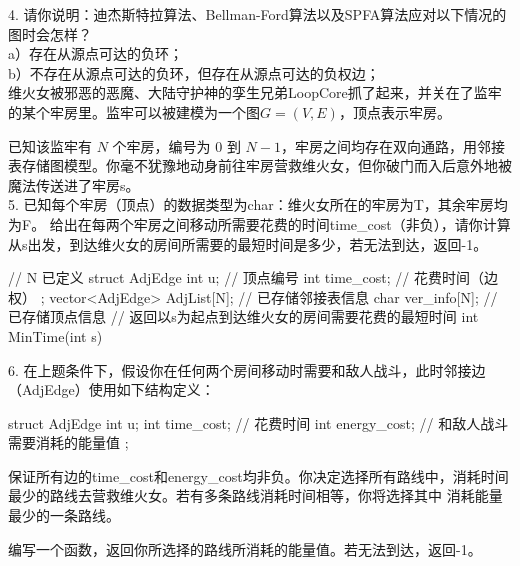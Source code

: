 \vspace{\baselineskip}

4. 请你说明：迪杰斯特拉算法、Bellman-Ford算法以及SPFA算法应对以下情况的图时会怎样？\\[0.5em]
a）存在从源点可达的负环；\\
b）不存在从源点可达的负环，但存在从源点可达的负权边；\\

维火女被邪恶的恶魔、大陆守护神的孪生兄弟LoopCore抓了起来，并关在了监牢的某个牢房里。监牢可以被建模为一个图$G=(V,E)$，顶点表示牢房。

已知该监牢有 $N$ 个牢房，编号为 0 到 $N-1$，牢房之间均存在双向通路，用邻接表存储图模型。你毫不犹豫地动身前往牢房营救维火女，但你破门而入后意外地被魔法传送进了牢房s。\\

5. 已知每个牢房（顶点）的数据类型为char：维火女所在的牢房为\textquotesingle T\textquotesingle，其余牢房均为\textquotesingle F\textquotesingle。
给出在每两个牢房之间移动所需要花费的时间time\_cost（非负），请你计算从s出发，到达维火女的房间所需要的最短时间是多少，若无法到达，返回-1。

\begin{cppcode}
    // N 已定义
    struct AdjEdge {
        int u;          // 顶点编号
        int time_cost;  // 花费时间（边权）
    };
    vector<AdjEdge> AdjList[N];    // 已存储邻接表信息
    char ver_info[N];   // 已存储顶点信息
    // 返回以s为起点到达维火女的房间需要花费的最短时间
    int MinTime(int s) {

    }
\end{cppcode}

\vspace{\baselineskip}

6. 在{\color{red}上题}条件下，假设你在任何两个房间移动时需要和敌人战斗，此时邻接边（AdjEdge）使用如下结构定义：
\begin{cppcode}
    struct AdjEdge {
        int u;
        int time_cost;      // 花费时间
        int energy_cost;    // 和敌人战斗需要消耗的能量值
    };
\end{cppcode}
保证所有边的time\_cost和energy\_cost均非负。你决定选择所有路线中，消耗时间最少的路线去营救维火女。若有多条路线消耗时间相等，你将选择其中
消耗能量最少的一条路线。

编写一个函数，返回你所选择的路线所消耗的能量值。若无法到达，返回-1。\\


